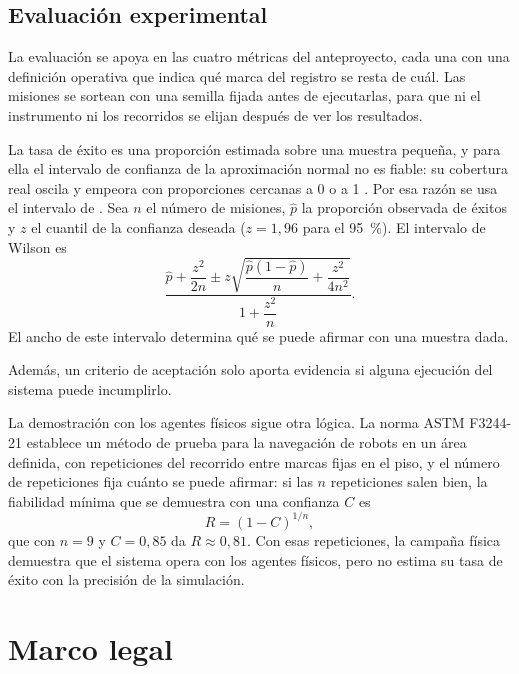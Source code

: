 \subsection{Evaluación experimental}
\label{sec:teo-evaluacion}

La evaluación se apoya en las cuatro métricas del anteproyecto, cada una con una definición operativa que indica
qué marca del registro se resta de cuál. Las misiones se sortean con una semilla fijada antes de ejecutarlas, para
que ni el instrumento ni los recorridos se elijan después de ver los resultados.

La tasa de éxito es una proporción estimada sobre una muestra pequeña, y para ella el intervalo de confianza de la aproximación normal no es fiable: su cobertura real oscila y empeora con proporciones cercanas a 0 o a 1 \autocite{brown2001interval}. Por esa razón se usa el intervalo de \textcite{wilson1927probable}. Sea $n$ el
número de misiones, $\hat{p}$ la proporción observada de éxitos y $z$ el cuantil
de la confianza deseada ($z = 1{,}96$ para el 95~\%). El intervalo de Wilson es
\begin{equation}
  \frac{\hat{p} + \dfrac{z^{2}}{2n} \pm z\sqrt{\dfrac{\hat{p}(1-\hat{p})}{n} + \dfrac{z^{2}}{4n^{2}}}}{1 + \dfrac{z^{2}}{n}} .
\end{equation}
El ancho de este intervalo determina qué se puede afirmar con una muestra dada.

Además, un criterio de aceptación solo aporta evidencia si alguna ejecución del sistema puede incumplirlo.

La demostración con los agentes físicos sigue otra lógica. La norma ASTM F3244-21 \autocite{astm2021f3244} establece
un método de prueba para la navegación de robots en un área definida, con repeticiones del recorrido entre marcas
fijas en el piso, y el número de repeticiones fija cuánto se puede afirmar: si las $n$ repeticiones salen bien, la
fiabilidad mínima que se demuestra con una confianza $C$ es
\begin{equation}
  R = (1-C)^{1/n} ,
\end{equation}
que con $n = 9$ y $C = 0{,}85$ da $R \approx 0{,}81$. Con esas repeticiones, la campaña física demuestra que el
sistema opera con los agentes físicos, pero no estima su tasa de éxito con la precisión de la simulación.

\section{Marco legal}
\label{sec:legal}


